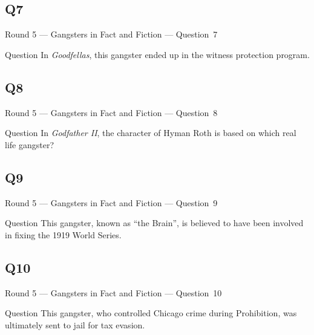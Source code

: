 \documentclass[11pt]{beamer}
\begin{document}
\subsection*{Q7}
\begin{frame}[t]{Round 5 --- Gangsters in Fact and Fiction --- \mbox{Question 7}}
\begin{block}{Question}
In \emph{Goodfellas}, this gangster ended up in the witness protection program.
\end{block}
\end{frame}
\subsection*{Q8}
\begin{frame}[t]{Round 5 --- Gangsters in Fact and Fiction --- \mbox{Question 8}}
\begin{block}{Question}
In \emph{Godfather II}, the character of Hyman Roth is based on which real life gangster? 
\end{block}
\end{frame}
\subsection*{Q9}
\begin{frame}[t]{Round 5 --- Gangsters in Fact and Fiction --- \mbox{Question 9}}
\begin{block}{Question}
This gangster, known as ``the Brain'', is believed to have been involved in fixing the 1919 World Series.
\end{block}
\end{frame}
\subsection*{Q10}
\begin{frame}[t]{Round 5 --- Gangsters in Fact and Fiction --- \mbox{Question 10}}
\begin{block}{Question}
This gangster, who controlled Chicago crime during Prohibition, was ultimately sent to jail for tax evasion.
\end{block}
\end{frame}
\end{document}
